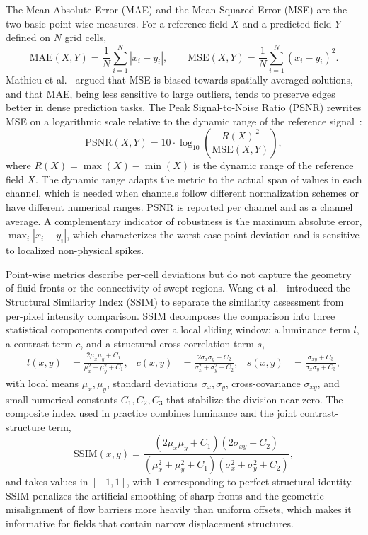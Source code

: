 The Mean Absolute Error (MAE) and the Mean Squared Error (MSE) are the two basic point-wise measures. For a reference field $X$ and a predicted field $Y$ defined on $N$ grid cells,
\begin{equation}
    \text{MAE}(X, Y) = \frac{1}{N} \sum_{i=1}^{N} |x_i - y_i|, \qquad
    \text{MSE}(X, Y) = \frac{1}{N} \sum_{i=1}^{N} (x_i - y_i)^2.
    \label{eq:mae_mse}
\end{equation}
Mathieu et al.~\cite{mathieu2016deep} argued that MSE is biased towards spatially averaged solutions, and that MAE, being less sensitive to large outliers, tends to preserve edges better in dense prediction tasks. The Peak Signal-to-Noise Ratio (PSNR) rewrites MSE on a logarithmic scale relative to the dynamic range of the reference signal~\cite{gonzalez2018digital}:
\begin{equation}
    \text{PSNR}(X, Y) = 10 \cdot \log_{10}\!\left(\frac{R(X)^{\,2}}{\text{MSE}(X, Y)}\right),
    \label{eq:psnr}
\end{equation}
where $R(X) = \max(X) - \min(X)$ is the dynamic range of the reference field $X$. The dynamic range adapts the metric to the actual span of values in each channel, which is needed when channels follow different normalization schemes or have different numerical ranges. PSNR is reported per channel and as a channel average. A complementary indicator of robustness is the maximum absolute error, $\max_i |x_i - y_i|$, which characterizes the worst-case point deviation and is sensitive to localized non-physical spikes.

Point-wise metrics describe per-cell deviations but do not capture the geometry of fluid fronts or the connectivity of swept regions. Wang et al.~\cite{wang2004image} introduced the Structural Similarity Index (SSIM) to separate the similarity assessment from per-pixel intensity comparison. SSIM decomposes the comparison into three statistical components computed over a local sliding window: a luminance term $l$, a contrast term $c$, and a structural cross-correlation term $s$,
\begin{align}
    l(x, y) &= \frac{2\mu_x\mu_y + C_1}{\mu_x^2 + \mu_y^2 + C_1}, &
    c(x, y) &= \frac{2\sigma_x\sigma_y + C_2}{\sigma_x^2 + \sigma_y^2 + C_2}, &
    s(x, y) &= \frac{\sigma_{xy} + C_3}{\sigma_x\sigma_y + C_3},
\end{align}
with local means $\mu_x, \mu_y$, standard deviations $\sigma_x, \sigma_y$, cross-covariance $\sigma_{xy}$, and small numerical constants $C_1, C_2, C_3$ that stabilize the division near zero. The composite index used in practice combines luminance and the joint contrast-structure term,
\begin{equation}
    \text{SSIM}(x, y) = \frac{(2\mu_x\mu_y + C_1)(2\sigma_{xy} + C_2)}{(\mu_x^2 + \mu_y^2 + C_1)(\sigma_x^2 + \sigma_y^2 + C_2)},
    \label{eq:ssim}
\end{equation}
and takes values in $[-1, 1]$, with $1$ corresponding to perfect structural identity. SSIM penalizes the artificial smoothing of sharp fronts and the geometric misalignment of flow barriers more heavily than uniform offsets, which makes it informative for fields that contain narrow displacement structures.

